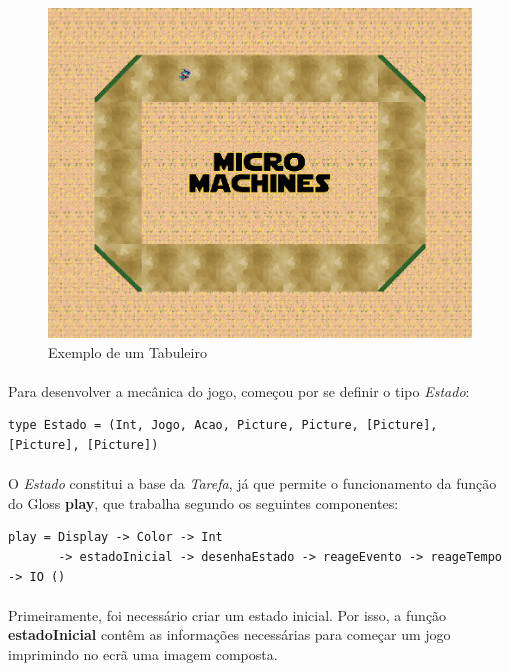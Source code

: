 \documentclass[12pt,a4paper]{report}
\begin{document}
\begin{figure}[H]
\centering
\caption{Exemplo de um Tabuleiro}
\includegraphics[scale = 0.35]{modoareia.png}
\end{figure}

\paragraph{} Para desenvolver a mecânica do jogo, começou por se definir o tipo \textit{Estado}:

\begin{verbatim}
type Estado = (Int, Jogo, Acao, Picture, Picture, [Picture], [Picture], [Picture])
\end{verbatim}

\paragraph{} O \textit{Estado} constitui a base da \textit{Tarefa}, já que permite o funcionamento da função do Gloss \textbf{play}, que trabalha segundo os seguintes componentes: 

\begin{verbatim}
play = Display -> Color -> Int 
       -> estadoInicial -> desenhaEstado -> reageEvento -> reageTempo -> IO ()
\end{verbatim}

\paragraph{} Primeiramente, foi necessário criar um estado inicial. Por isso, a função \textbf{estadoInicial} contêm as informações necessárias para começar um jogo imprimindo no ecrã uma imagem composta.
\end{document}
